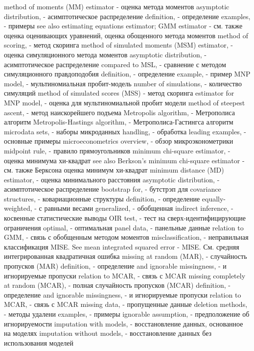 method of moments (MM) estimator - оценка метода моментов
asymptotic distribution, - асимптотическое распределение
definition, - определение
examples, - примеры
see also estimating equations estimator; GMM estimator - см. также оценка оценивающих уравнений, оценка обощенного метода моментов
method of scoring, - метод скоринга
method of simulated moments (MSM) estimator, - оценка симуляционного метода моментов
asymptotic distribution, - асимптотическое распределение
compared to MSL, - сравнение с методом симуляционного правдоподобия
definition, - определение
example, - пример
MNP model, - мультиномиальная пробит-модель
number of simulations, - количество симуляций
method of simulated scores (MSS)  - метод скоринга
estimator for MNP model, - оценка для мультиномиальной пробит модели
method of steepest ascent, - метод наискорейшего подъема
Metropolis algorithm, - Метрополиса алгоритм
Metropolis-Hastings algorithm, - Метрополиса-Гастингса алгоритм
microdata sets, - наборы микроданных
handling, - обработка
leading examples, - основные примеры
microeconometrics overview, - обзор микроэконометрики
midpoint rule, - правило прямоугольников
minimum chi-square estimator, - оценка минимума хи-квадрат
see also Berkson’s minimum chi-square estimator  - см. также Берксона оценка минимум хи-квадрат
minimum distance (MD) estimator, - оценка минимального расстояния
asymptotic distribution, - асимптотическое распределение
bootstrap for, - бутстрэп для
covariance structures, - ковариационные структуры
definition, - определение
equally-weighted, - с равными весами
generalized, - обобщенная
indirect inference, - косвенные статистические выводы
OIR test, - тест на сверх-идентифицирующие ограничения
optimal, - оптимальная
panel data, - панельные данные
relation to GMM, - связь с обобщенным методом моментов
misclassification, - неправильная классификация
MISE. See mean integrated squared error - MISE. См. средняя интегрированная квадратичная ошибка
missing at random (MAR), - случайность пропусков (MAR)
definition, - определение
and ignorable missingness, - и игнорируемые пропуски
relation to MCAR, - связь с MCAR
missing completely at random (MCAR), - полная случайность пропусков (MCAR)
definition, - определение
and ignorable missingness, - и игнорируемые пропуски
relation to MCAR, - связь с MCAR
missing data, - пропущенные данные
deletion methods, - методы удалени
examples, - примеры
ignorable assumption, - предположение об игнорируемости
imputation with models, - восстановление данных, основанное на моделях
imputation without models, - восстановление данных без использования моделей
